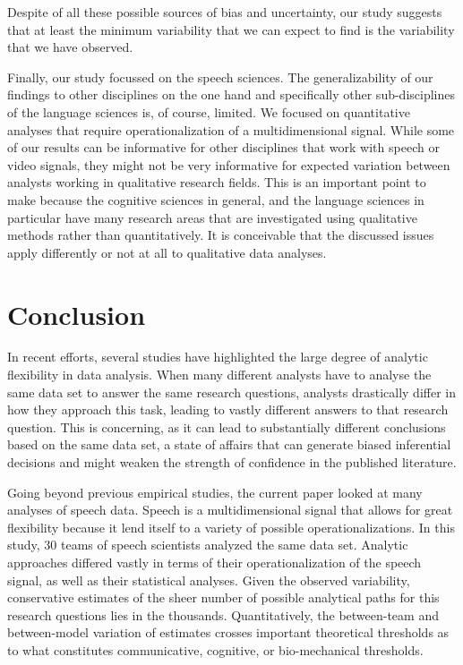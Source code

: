 \documentclass[Review,times,sageh]{sagej}
\begin{document}
Despite of all these possible sources of bias and uncertainty, our study suggests that at least the minimum variability that we can expect to find is the variability that we have observed.

Finally, our study focussed on the speech sciences.
The generalizability of our findings to other disciplines on the one hand and specifically other sub-disciplines of the language sciences is, of course, limited.
We focused on quantitative analyses that require operationalization of a multidimensional signal.
While some of our results can be informative for other disciplines that work with speech or video signals, they might not be very informative for expected variation between analysts working in qualitative research fields.
This is an important point to make because the cognitive sciences in general, and the language sciences in particular have many research areas that are investigated using qualitative methods rather than quantitatively.
It is conceivable that the discussed issues apply differently or not at all to qualitative data analyses.

\hypertarget{conclusion}{%
\section{Conclusion}\label{conclusion}}

In recent efforts, several studies have highlighted the large degree of analytic flexibility in data analysis.
When many different analysts have to analyse the same data set to answer the same research questions, analysts drastically differ in how they approach this task, leading to vastly different answers to that research question.
This is concerning, as it can lead to substantially different conclusions based on the same data set, a state of affairs that can generate biased inferential decisions and might weaken the strength of confidence in the published literature.

Going beyond previous empirical studies, the current paper looked at many analyses of speech data.
Speech is a multidimensional signal that allows for great flexibility because it lend itself to a variety of possible operationalizations.
In this study, 30 teams of speech scientists analyzed the same data set.
Analytic approaches differed vastly in terms of their operationalization of the speech signal, as well as their statistical analyses.
Given the observed variability, conservative estimates of the sheer number of possible analytical paths for this research questions lies in the thousands.
Quantitatively, the between-team and between-model variation of estimates crosses important theoretical thresholds as to what constitutes communicative, cognitive, or bio-mechanical thresholds.
\end{document}

